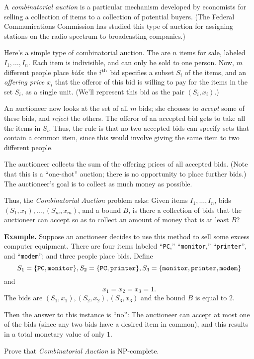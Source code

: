 \documentclass[12pt]{article}
\begin{document}
\begin{enumerate}
A {\em combinatorial auction} is a particular mechanism
developed by economists for selling a collection
of items to a collection of potential buyers.
(The Federal Communications Commission has studied
this type of auction for
assigning stations on the radio spectrum to broadcasting companies.)

Here's a simple type of combinatorial auction.
The are $n$ items for sale, labeled $I_1, \ldots, I_n$.
Each item is indivisible, and can only be sold to one person.
Now, $m$ different people place {\em bids}:
the $i^{\rm th}$ bid specifies
a subset $S_i$ of the items, and
an {\em offering price} $x_i$ that
the offeror of this bid is willing to pay for
the items in the set $S_i$, as a single unit.
(We'll represent this bid as the pair $(S_i,x_i)$.)

An auctioneer now looks at the set of all $m$ bids;
she chooses to {\em accept} some of these bids,
and {\em reject} the others.
The offeror of an accepted bid gets to take all the items in $S_i$.
Thus, the rule is that no two accepted bids can specify
sets that contain a common item,
since this would involve giving the same item to two different people.

The auctioneer collects the sum of the offering prices
of all accepted bids.
(Note that this is a ``one-shot'' auction; there is
no opportunity to place further bids.)
The auctioneer's goal is to collect as much money as possible.

\bigskip
Thus, the {\em Combinatorial Auction} problem asks:
Given items $I_1, \ldots, I_n$,
bids $(S_1, x_1), \ldots, (S_m, x_m)$,
and a bound $B$, is there a collection of bids
that the auctioneer can accept so as to collect
an amount of money that is at least $B$?

\bigskip
{\bf Example.}  Suppose an auctioneer decides to use
this method to sell some excess computer equipment.
There are four items labeled
``{\tt PC},'' ``{\tt monitor},'' ``{\tt printer}'', and
``{\tt modem}''; and
three people place bids.
Define
$$S_1 = \{{\tt PC}, {\tt monitor}\},
S_2 = \{{\tt PC}, {\tt printer}\},
S_3 = \{{\tt monitor}, {\tt printer}, {\tt modem}\}$$
and
$$x_1 = x_2 = x_3 = 1.$$
The bids are $(S_1, x_1), (S_2, x_2), (S_3, x_3)$
and the bound $B$ is equal to $2$.

Then the answer to this instance is ``no'':
The auctioneer can accept at most one of the bids
(since any two bids have a desired item in common),
and this results in a total monetary value of only $1$.

\bigskip
Prove that {\em Combinatorial Auction} is NP-complete.










\end{enumerate}
\end{document}

